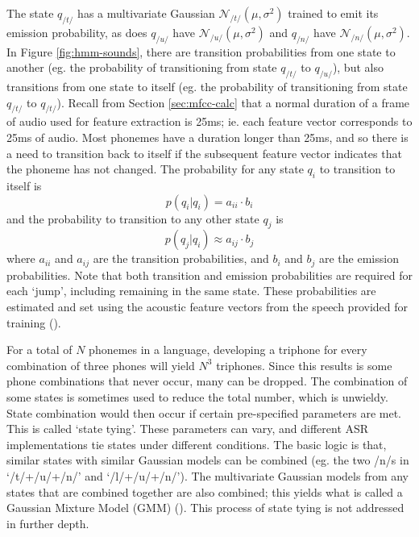 The state $q_{/t/}$ has a multivariate Gaussian $\mathcal{N}_{/t/}(\mu,\sigma^2)$ trained to emit its emission probability, as does $q_{/u/}$ have $\mathcal{N}_{/u/}(\mu,\sigma^2)$ and $q_{/n/}$ have $\mathcal{N}_{/n/}(\mu,\sigma^2)$.  In Figure \ref{fig:hmm-sounds}, there are transition probabilities from one state to another (eg. the probability of transitioning from state $q_{/t/}$ to $q_{/u/}$), but also transitions from one state to itself (eg. the probability of transitioning from state $q_{/t/}$ to $q_{/t/}$).  Recall from Section \ref{sec:mfcc-calc} that a normal duration of a frame of audio used for feature extraction is 25ms; ie. each feature vector corresponds to 25ms of audio.  Most phonemes have a duration longer than 25ms, and so there is a need to transition back to itself if the subsequent feature vector indicates that the phoneme has not changed.  The probability for any state $q_i$ to transition to itself is \begin{equation} p(q_i|q_i) = a_{ii}\cdot b_i \end{equation} and the probability to transition to any other state $q_j$ is \begin{equation} p(q_j|q_i) \approx a_{ij}\cdot b_j \end{equation} where $a_{ii}$ and $a_{ij}$ are the transition probabilities, and $b_i$ and $b_j$ are the emission probabilities.  Note that both transition and emission probabilities are required for each `jump', including remaining in the same state.  These probabilities are estimated and set using the acoustic feature vectors from the speech provided for training (\cite{gales:07}).

For a total of $N$ phonemes in a language, developing a triphone for every combination of three phones will yield $N^3$ triphones.  Since this results is some phone combinations that never occur, many can be dropped.  The combination of some states is sometimes used to reduce the total number, which is unwieldy.  State combination would then occur if certain pre-specified parameters are met.  This is called `state tying'. These parameters can vary, and different ASR implementations tie states under different conditions.  The basic logic is that, similar states with similar Gaussian models can be combined (eg. the two /n/s in `/t/+/u/+/n/' and `/l/+/u/+/n/').  The multivariate Gaussian models from any states that are combined together are also combined; this yields what is called a Gaussian Mixture Model (GMM) (\cite{gales:07}).  This process of state tying is not addressed in further depth.

